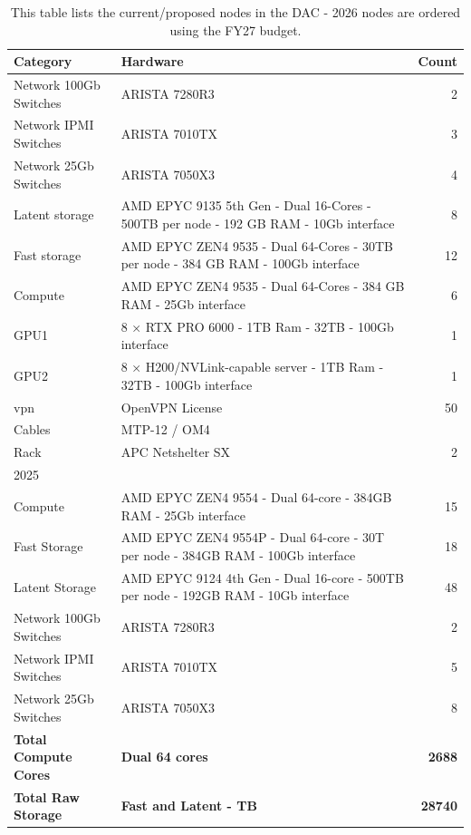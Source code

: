 \tiny \begin{longtable} {|l |p{} |r  |} \caption{This table lists the current/proposed nodes in the DAC - 2026 nodes are ordered using the FY27 budget. \label{tab:chileDAC}}\\ 
\hline 
\textbf{Category}&\textbf{Hardware}&\textbf{Count} \\ \hline
{Network 100Gb Switches}&{ARISTA 7280R3}&{2} \\ \hline
{Network IPMI Switches}&{ARISTA 7010TX}&{3} \\ \hline
{Network 25Gb Switches}&{ARISTA 7050X3}&{4} \\ \hline
{Latent storage}&{AMD EPYC 9135 5th Gen - Dual 16-Cores - 500TB per node - 192 GB RAM - 10Gb interface}&{8} \\ \hline
{Fast storage}&{AMD EPYC ZEN4 9535 - Dual 64-Cores - 30TB per node - 384 GB RAM - 100Gb interface}&{12} \\ \hline
{Compute}&{AMD EPYC ZEN4 9535 - Dual 64-Cores  - 384 GB RAM - 25Gb interface}&{6} \\ \hline
{GPU1}&{8 × RTX PRO 6000 - 1TB Ram - 32TB - 100Gb interface}&{1} \\ \hline
{GPU2}&{8 × H200/NVLink-capable server - 1TB Ram - 32TB - 100Gb interface}&{1} \\ \hline
{vpn}&{OpenVPN License}&{50} \\ \hline
{Cables}&{MTP-12 / OM4}& \\ \hline
{Rack}&{APC Netshelter SX}&{2} \\ \hline
{2025}&& \\ \hline
{Compute}&{AMD EPYC ZEN4 9554 - Dual 64-core - 384GB RAM - 25Gb interface}&{15} \\ \hline
{Fast Storage}&{AMD EPYC ZEN4 9554P - Dual 64-core - 30T per node - 384GB RAM - 100Gb interface }&{18} \\ \hline
{Latent Storage}&{AMD EPYC 9124 4th Gen - Dual 16-core - 500TB per node - 192GB RAM - 10Gb interface }&{48} \\ \hline
{Network 100Gb Switches}&{ARISTA 7280R3}&{2} \\ \hline
{Network IPMI Switches}&{ARISTA 7010TX}&{5} \\ \hline
{Network 25Gb Switches}&{ARISTA 7050X3}&{8} \\ \hline
\textbf{Total Compute Cores}&\textbf{Dual 64 cores}&\textbf{2688} \\ \hline
\textbf{Total Raw Storage}&\textbf{Fast and Latent - TB}&\textbf{28740} \\ \hline
\end{longtable} \normalsize
